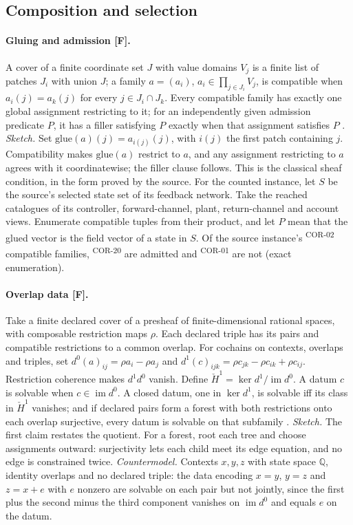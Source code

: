 \documentclass[pdflatex,sn-basic]{sn-jnl}%
\newcommand{\slot}[1]{}%
\newcommand{\rec}[1]{\ifannotated\textsuperscript{\textcolor{blue!60!black}{\tiny#1}}\fi}
\begin{document}
\begin{appendices}
\subsection{Composition and selection}\label{app:composition}

\slot{A.1}
\paragraph{Gluing and admission [F].} A cover of a finite coordinate set $J$ with value domains $V_j$ is a finite list of patches $J_i$ with union $J$; a family $a=(a_i)$, $a_i\in\prod_{j\in J_i}V_j$, is compatible when $a_i(j)=a_k(j)$ for every $j\in J_i\cap J_k$. Every compatible family has exactly one global assignment restricting to it; for an independently given admission predicate $P$, it has a filler satisfying $P$ exactly when that assignment satisfies $P$ \citep{tsiokos2026v10}. \emph{Sketch.} Set $\mathrm{glue}(a)(j)=a_{i(j)}(j)$, with $i(j)$ the first patch containing $j$. Compatibility makes $\mathrm{glue}(a)$ restrict to $a$, and any assignment restricting to $a$ agrees with it coordinatewise; the filler clause follows. This is the classical sheaf condition, in the form proved by the source. For the counted instance, let $S$ be the source's selected state set of its feedback network. Take the reached catalogues of its controller, forward-channel, plant, return-channel and account views. Enumerate compatible tuples from their product, and let $P$ mean that the glued vector is the field vector of a state in $S$. Of the source instance's \numVTenCompatible\rec{COR-02} compatible families, \numVTenAdmitted\rec{COR-20} are admitted and \numVTenNotAdmitted\rec{COR-01} are not (exact enumeration).

\paragraph{Overlap data [F].} Take a finite declared cover of a presheaf of finite-dimensional rational spaces, with composable restriction maps $\rho$. Each declared triple has its pairs and compatible restrictions to a common overlap. For cochains on contexts, overlaps and triples, set $d^0(a)_{ij}=\rho a_i-\rho a_j$ and $d^1(c)_{ijk}=\rho c_{jk}-\rho c_{ik}+\rho c_{ij}$. Restriction coherence makes $d^1d^0$ vanish. Define $\check H^1=\ker d^1/\operatorname{im}d^0$. A datum $c$ is solvable when $c\in\operatorname{im}d^0$. A closed datum, one in $\ker d^1$, is solvable iff its class in $\check H^1$ vanishes; and if declared pairs form a forest with both restrictions onto each overlap surjective, every datum is solvable on that subfamily \citep{tsiokos2026v12}. \emph{Sketch.} The first claim restates the quotient. For a forest, root each tree and choose assignments outward: surjectivity lets each child meet its edge equation, and no edge is constrained twice. \emph{Countermodel.} Contexts $x,y,z$ with state space $\mathbb Q$, identity overlaps and no declared triple: the data encoding $x=y$, $y=z$ and $z=x+e$ with $e$ nonzero are solvable on each pair but not jointly, since the first plus the second minus the third component vanishes on $\operatorname{im}d^0$ and equals $e$ on the datum.


\end{appendices}
\end{document}
